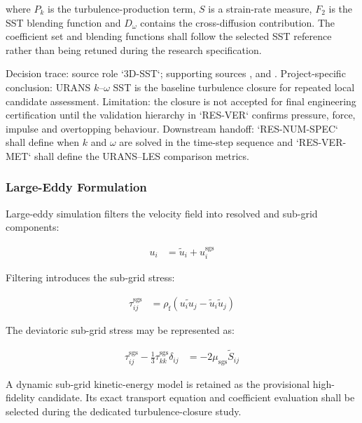 where $P_k$ is the turbulence-production term, $S$ is a strain-rate
measure, $F_2$ is the SST blending function and $D_{\omega}$ contains
the cross-diffusion contribution. The coefficient set and blending
functions shall follow the selected SST reference rather than being
retuned during the research specification.

Decision trace: source role `3D-SST`; supporting sources
\textcite{menter1994twoequation}, \textcite{kozelkov2022turbulence}
and \textcite{watanabe2022validation}. Project-specific conclusion:
URANS $k$--$\omega$ SST is the baseline turbulence closure for repeated
local candidate assessment. Limitation: the closure is not accepted
for final engineering certification until the validation hierarchy in
`RES-VER` confirms pressure, force, impulse and overtopping behaviour.
Downstream handoff: `RES-NUM-SPEC` shall define when $k$ and $\omega$
are solved in the time-step sequence and `RES-VER-MET` shall define
the URANS--LES comparison metrics.

\subsubsection{Large-Eddy Formulation}
\label{sec:res-mod-src-local-les}

Large-eddy simulation filters the velocity field into resolved and
sub-grid components:

\begin{align}
  u_i
  &=
  \widetilde{u}_i
  +
  u_i^{\mathrm{sgs}}
  \label{eq:res-mod-src-les-velocity-decomposition}
\end{align}

Filtering introduces the sub-grid stress:

\begin{align}
  \tau_{ij}^{\mathrm{sgs}}
  &=
  \rho_{\mathrm{f}}
  \left(
    \widetilde{u_i u_j}
    -
    \widetilde{u}_i\widetilde{u}_j
  \right)
  \label{eq:res-mod-src-les-subgrid-stress}
\end{align}

The deviatoric sub-grid stress may be represented as:

\begin{align}
  \tau_{ij}^{\mathrm{sgs}}
  -
  \frac{1}{3}
  \tau_{kk}^{\mathrm{sgs}}
  \delta_{ij}
  &=
  -2\mu_{\mathrm{sgs}}
  \widetilde{S}_{ij}
  \label{eq:res-mod-src-les-eddy-viscosity-closure}
\end{align}

A dynamic sub-grid kinetic-energy model is retained as the provisional
high-fidelity candidate. Its exact transport equation and coefficient
evaluation shall be selected during the dedicated turbulence-closure
study.


